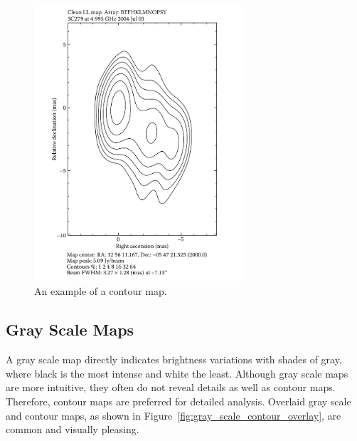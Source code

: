\begin{figure}[H]
    \centering
    \includegraphics[width=0.7\textwidth]{Images/contour_map.png}
    \caption{An example of a contour map.}
    \label{fig:contour_map}
\end{figure}

\subsection{Gray Scale Maps}

A gray scale map directly indicates brightness variations with shades of gray, where black is the most intense and white the least. Although gray scale maps are more intuitive, they often do not reveal details as well as contour maps. Therefore, contour maps are preferred for detailed analysis. Overlaid gray scale and contour maps, as shown in Figure~\ref{fig:gray_scale_contour_overlay}, are common and visually pleasing.

